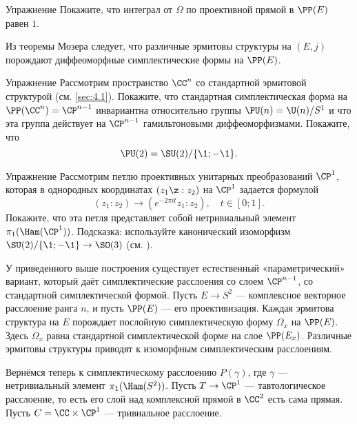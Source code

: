 \begin{thm}{Упражнение}\label{9.2.A}
Покажите, что интеграл от $\Omega$ по проективной прямой в $\PP(E)$ равен $1$.
\end{thm}

Из теоремы Мозера \cite{MS} следует, что различные эрмитовы структуры на $(E, j)$ порождают диффеоморфные симплектические формы на $\PP(E)$.

\begin{thm}{Упражнение}\label{9.2.B}
Рассмотрим пространство $\CC^n$ со стандартной эрмитовой структурой (см. \ref{sec:4.1}).
Покажите, что стандартная симплектическая форма на $\PP(\CC^n ) = \CP^{n-1}$ инвариантна относительно группы $\PU (n) = \U (n)/S^1$ и что эта группа действует на $\CP^{n-1}$ гамильтоновыми диффеоморфизмами.
Покажите, что 
\[\PU (2) = \SU (2)/\{\1; -\1\}.\]

\end{thm}

\begin{thm}{Упражнение}\label{9.2.C}
Рассмотрим петлю проективных унитарных преобразований $\CP^1$, которая в однородных координатах $(z_1 \z: z_2)$ на $\CP^1$ задается формулой 
\[(z_1 : z_2 ) \to (e^{-2\pi it} z_1 : z_2 ),\quad t \in [0; 1].\]
Покажите, что эта петля представляет собой нетривиальный элемент $\pi_1 (\Ham(\CP^1 ))$.
Подсказка: используйте канонический изоморфизм $\SU (2)/\{\1; -\1\} \to \SO(3)$ (см. \cite{DFN}).
\end{thm}

У приведенного выше построения существует естественный «параметрический» вариант, который даёт симплектические расслоения со слоем $\CP^{n-1}$, со стандартной симплектической формой.
Пусть $E \to S^2$ --- комплексное векторное расслоение ранга $n$, и пусть $\PP(E)$ --- его проективизация.
Каждая эрмитова структура на $E$ порождает послойную симплектическую форму $\Omega_x$ на $\PP(E)$.
Здесь $\Omega_x$ равна стандартной симплектической форме на слое $\PP(E_x)$.
Различные эрмитовы структуры приводят к изоморфным симплектическим расслоениям.

Вернёмся теперь к симплектическому расслоению $P(\gamma)$, где $\gamma$ --- нетривиальный элемент $\pi_1 (\Ham(S^2 ))$.
Пусть $T \to \CP^1$ --- тавтологическое расслоение,
то есть его слой над комплексной прямой в $\CC^2$ есть сама прямая.
Пусть $C = \CC \times \CP^1$ --- тривиальное расслоение.

